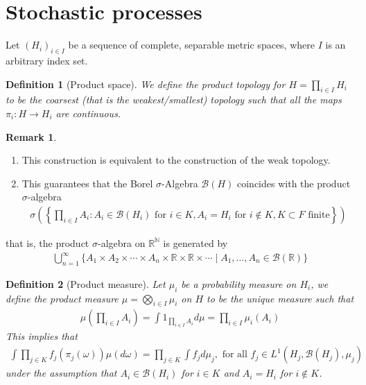 \documentclass[11pt,a4paper, final]{article}
\newtheorem{defn}{Definition}[section]
\theoremstyle{definition}
\newtheorem{rem}{Remark}[section]
\begin{document}
\section{Stochastic processes}
Let $(H_i)_{i \in I}$ be a sequence of complete, separable metric spaces, where $I$ is an arbitrary index set.
\begin{defn}[Product space] We define the product topology for $H= \prod_{i \in I} H_i$ to be the coarsest (that is the weakest/smallest) topology such that all the maps $\pi_i: H \to H_i$ are continuous. 
\end{defn}
\begin{rem} \ \begin{enumerate}
\item This construction is equivalent to the construction of the weak topology. 
\item This guarantees that the Borel $\sigma$-Algebra $\mathcal{B}(H)$ coincides with the product $\sigma$-algebra
\begin{align*}
\sigma \left( \left\{ \prod_{i \in I} A_i : A_i \in \mathcal{B}(H_i) \text{ for } i \in K, A_i = H_i \text{ for } i \notin K, K \subset F \text{ finite} \right\} \right) 
\end{align*}
\end{enumerate}
that is, the product $\sigma$-algebra on $\mathbb{R}^\mathbb{N}$ is generated by 
\begin{align*}
\bigcup_{n=1}^\infty \{ A_1 \times A_2 \times \cdots \times A_n \times \mathbb{R} \times \mathbb{R} \times \cdots \mid A_1, \dots , A_n \in \mathcal{B}(\mathbb{R}) \} 
\end{align*}
\end{rem}
\begin{defn}[Product measure] Let $\mu_i$ be a probability measure on $H_i$, we define the product measure $\mu = \bigotimes_{i \in I} \mu_i$ on $H$ to be the unique measure such that 
\begin{align*}
\mu \left( \prod_{i \in I} A_i \right) = \int 1_{ \prod_{i \in I} A_i } d \mu = \prod_{i \in I} \mu_i (A_i) 
\end{align*}
This implies that 
\begin{align*}
\int \prod_{j \in K} f_j ( \pi_j ( \omega)) \mu (d \omega) = \prod_{j \in K} \int f_j d \mu_j, \text{ for all } f_j \in L^1(H_j , \mathcal{B}(H_j), \mu_j) 
\end{align*}
under the assumption that $A_i \in \mathcal{B}(H_i)$ for $i \in K$ and $A_i=H_i$ for $i \notin K$. 
\end{defn}
\end{document}
